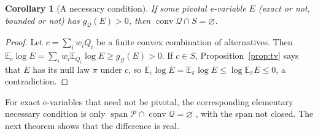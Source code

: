 \documentclass[11pt,a4paper]{article}
\newtheorem{corollary}[theorem]{Corollary}
\theoremstyle{definition}
\theoremstyle{remark}
\newcommand{\PP}{\mathcal P}
\newcommand{\QQ}{\mathcal Q}
\newcommand{\EE}{\mathbb E}
\newcommand{\conv}{\operatorname{conv}}
\newcommand{\spn}{\operatorname{span}}
\begin{document}
\begin{corollary}[A necessary condition]\label{cor:necessary}
If some pivotal e-variable \(E\) (exact or not, bounded or not) has \(g_{\QQ}(E)>0\), then \(\conv\QQ\cap S=\varnothing\).
\end{corollary}
\begin{proof}
Let \(c=\sum_iw_iQ_i\) be a finite convex combination of alternatives. Then \(\EE_c\log E=\sum_iw_i\EE_{Q_i}\log E\ge g_{\QQ}(E)>0\). If \(c\in S\), Proposition~\ref{prop:tv} says that \(E\) has its null law \(\pi\) under \(c\), so \(\EE_c\log E=\EE_\pi\log E\le\log\EE_\pi E\le0\), a contradiction.
\end{proof}

For exact e-variables that need not be pivotal, the corresponding elementary necessary condition is only \(\spn\PP\cap\conv\QQ=\varnothing\) \cite{ZRW}, with the span not closed. The next theorem shows that the difference is real.
\end{document}
